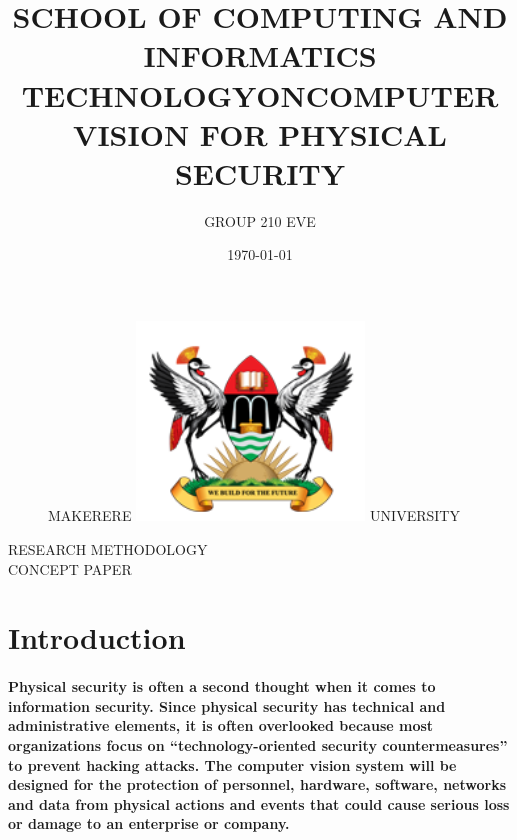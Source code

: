\documentclass[11pt]{article}
\begin{document}
		
\title{SCHOOL OF COMPUTING AND INFORMATICS\\ TECHNOLOGY}
\author{GROUP 210 EVE}
\date{\today{}}
\begin{figure}
	\begin{center}
	\Huge MAKERERE \includegraphics[width=172pt]{muk.png} \Huge UNIVERSITY
	\end{center}
\end{figure}
	\maketitle
	
	\begin{center}
	RESEARCH METHODOLOGY \\CONCEPT PAPER
	\end{center}
\begin{center}
	\title{ON}
\end{center}
	\begin{center}
		\title{COMPUTER VISION FOR PHYSICAL SECURITY}
	\end{center}
    
	\newpage
	\section{ \textbf{Introduction} }
	 \paragraph{\textmd{Physical security is often a second thought when it comes to information security. Since physical security has technical and administrative elements, it is often overlooked because most organizations focus on “technology-oriented security countermeasures” \cite{DUMMY:2} to prevent hacking attacks. The computer vision system will be designed for the protection of personnel, hardware, software, networks and data from physical actions and events that could cause serious loss or damage to an enterprise or company.}}
	 
\end{document}
